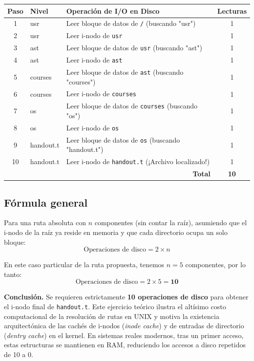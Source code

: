 \documentclass[12pt,letterpaper]{article}
\begin{document}
\begin{center}
  \renewcommand{\arraystretch}{1.5}
  \begin{tabular}{c >{\ttfamily}l p{7cm} c}
    \toprule
    \textbf{Paso} & \textbf{Nivel} & \textbf{Operación de I/O en Disco} & \textbf{Lecturas} \\
    \midrule
    1  & usr       & Leer bloque de datos de \texttt{/} (buscando "usr")         & 1 \\
    2  & usr       & Leer i-nodo de \texttt{usr}                                  & 1 \\
    3  & ast       & Leer bloque de datos de \texttt{usr} (buscando "ast")        & 1 \\
    4  & ast       & Leer i-nodo de \texttt{ast}                                  & 1 \\
    5  & courses   & Leer bloque de datos de \texttt{ast} (buscando "courses")    & 1 \\
    6  & courses   & Leer i-nodo de \texttt{courses}                              & 1 \\
    7  & os        & Leer bloque de datos de \texttt{courses} (buscando "os")     & 1 \\
    8  & os        & Leer i-nodo de \texttt{os}                                   & 1 \\
    9  & handout.t & Leer bloque de datos de \texttt{os} (buscando "handout.t")   & 1 \\
    10 & handout.t & Leer i-nodo de \texttt{handout.t} (¡Archivo localizado!)     & 1 \\
    \midrule
    \multicolumn{3}{r}{\textbf{Total}} & \textbf{10} \\
    \bottomrule
  \end{tabular}
\end{center}

\subsection*{Fórmula general}
\noindent
Para una ruta absoluta con $n$ componentes (sin contar la raíz), asumiendo que el i-nodo de la raíz ya reside en
memoria y que cada directorio ocupa un solo bloque:
\[
\text{Operaciones de disco} = 2 \times n
\]

\noindent
En este caso particular de la ruta propuesta, tenemos $n = 5$ componentes, por lo tanto:
\[
\text{Operaciones de disco} = 2 \times 5 = \mathbf{10}
\]

\begin{mdframed}[backgroundcolor=graybox, linecolor=accentblue, linewidth=1pt, roundcorner=4pt]
  \textbf{Conclusión.} Se requieren estrictamente \textbf{10 operaciones de disco} para obtener el i-nodo final
  de \texttt{handout.t}. Este ejercicio teórico ilustra el altísimo costo computacional de la resolución de rutas
  en UNIX y motiva la existencia arquitectónica de las cachés de i-nodos (\textit{inode cache}) y de entradas de
  directorio (\textit{dentry cache}) en el kernel. En sistemas reales modernos, tras un primer acceso, estas
  estructuras se mantienen en RAM, reduciendo los accesos a disco repetidos de 10 a 0.
\end{mdframed}
\end{document}
